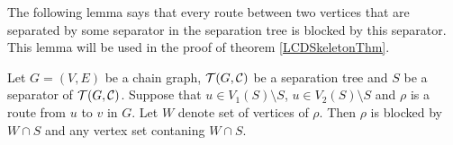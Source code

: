 %
%
%
%

The following lemma says that every route between two vertices that are separated by some separator in the separation tree
is blocked by this separator. This lemma will be used in the proof of theorem \ref{LCDSkeletonThm}. 

\begin{lemma} \label{lemma9}
	Let $G = (V, E)$ be a chain graph, $\mathcal{T}(G, \mathcal{C})$ be a separation tree and $S$ be a separator of $\mathcal{T}(G, \mathcal{C})$.
	Suppose that $u \in V_1(S) \setminus S$, $u \in V_2(S) \setminus S$ and $\rho$ is a route from $u$ to $v$ in $G$. Let $W$ denote
	set of vertices of $\rho$. Then $\rho$ is blocked by $W \cap S$ and any vertex set contaning $W \cap S$.
\end{lemma}

